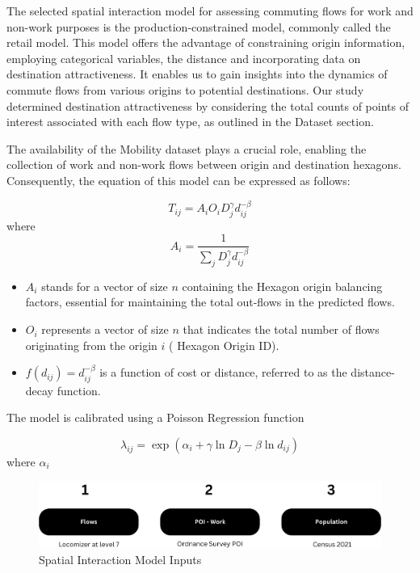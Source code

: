 The selected spatial interaction model for assessing commuting flows for work and non-work purposes is the production-constrained model, commonly called the retail model. This model offers the advantage of constraining origin information, employing categorical variables, the distance and incorporating data on destination attractiveness. It enables us to gain insights into the dynamics of commute flows from various origins to potential destinations. Our study determined destination attractiveness by considering the total counts of points of interest associated with each flow type, as outlined in the Dataset section.


The availability of the Mobility dataset plays a crucial role, enabling the collection of work and non-work flows between origin and destination hexagons. Consequently, the equation of this model can be expressed as follows:

\begin{equation} \label{eq:1} \tag{1}
T_{ij} = A_i O_i D_j^\gamma d_{ij}^{-\beta}
\end{equation}
where
\begin{equation} \label{eq:3} \tag{2}
A_i = \frac{1}{\sum_j D_j^\gamma d_{ij}^{-\beta}}
\end{equation}

\begin{itemize}
    \item $A_i$ stands for a vector of size $n$ containing the Hexagon origin balancing factors, essential for maintaining the total out-flows in the predicted flows.
    \item $O_i$  represents a vector of size $n$ that indicates the total number of flows originating from the origin $i$ ( Hexagon Origin ID).
    \item $f(d_{ij})=d_{ij}^{-\beta}$  is a function of cost or distance, referred to as the distance-decay function.
\end{itemize}

The model is calibrated using a Poisson Regression function

\begin{equation} \label{eq:4} \tag{4}
\lambda_{ij} = \exp (\alpha_i + \gamma \ln D_j - \beta \ln d_{ij})
\end{equation}
where $\alpha_i$

\begin{figure}[H]
        \centering
        \includegraphics[width=14cm]{Images/SIM_fig.png}
        \caption{Spatial Interaction Model Inputs}
        \label{fig: SIM_input}
    \end{figure}


